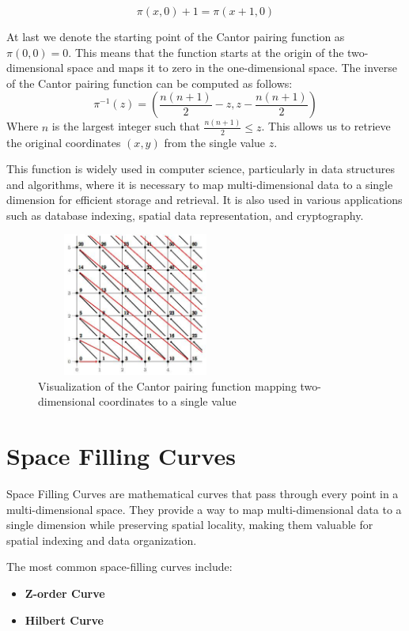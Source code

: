 \[
    \pi(x, 0) + 1 = \pi(x + 1, 0)
\]

At last we denote the starting point of the Cantor pairing function as \( \pi(0, 0) = 0 \). This means that the function starts at the origin of the two-dimensional space and maps it to zero in the one-dimensional space. The inverse of the Cantor pairing function can be computed as follows:
\[
    \pi^{-1}(z) = \left( \frac{n(n + 1)}{2} - z, z - \frac{n(n + 1)}{2} \right)
\]
Where \( n \) is the largest integer such that \( \frac{n(n + 1)}{2} \leq z \). This allows us to retrieve the original coordinates \( (x, y) \) from the single value \( z \).

This function is widely used in computer science, particularly in data structures and algorithms, where it is necessary to map multi-dimensional data to a single dimension for efficient storage and retrieval. It is also used in various applications such as database indexing, spatial data representation, and cryptography.


\vspace{5mm}

\begin{figure}[h]
    \centering
    \includegraphics[width=6.5cm,height=4.7cm]{img/cantor-pairing.jpg}
    \caption{Visualization of the Cantor pairing function mapping two-dimensional coordinates to a single value}
    \label{fig:cantor}
\end{figure}

\vspace{5mm}

\section{Space Filling Curves}
Space Filling Curves are mathematical curves that pass through every point in a multi-dimensional space. They provide a way to map multi-dimensional data to a single dimension while preserving spatial locality, making them valuable for spatial indexing and data organization.

The most common space-filling curves include:
\begin{itemize}
    \item \textbf{Z-order Curve}
    \item \textbf{Hilbert Curve}
\end{itemize}


